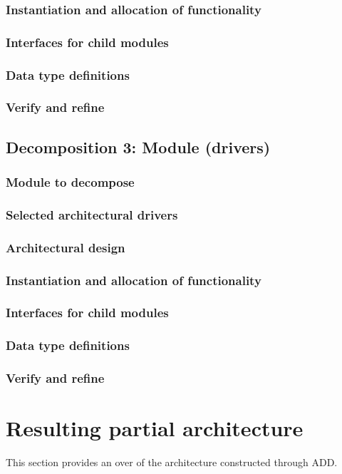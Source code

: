 \documentclass[a4paper,10pt]{article}
\begin{document}
\subsubsection{Instantiation and allocation of functionality}
\subsubsection{Interfaces for child modules}
\subsubsection{Data type definitions}
\subsubsection{Verify and refine}

\subsection{Decomposition 3: Module (drivers)}
\subsubsection{Module to decompose}
\subsubsection{Selected architectural drivers}
\subsubsection{Architectural design}
\subsubsection{Instantiation and allocation of functionality}
\subsubsection{Interfaces for child modules}
\subsubsection{Data type definitions}
\subsubsection{Verify and refine}

\section{Resulting partial architecture}\label{sec:architecture}
This section provides an over of the architecture constructed through ADD\@.
\end{document}
